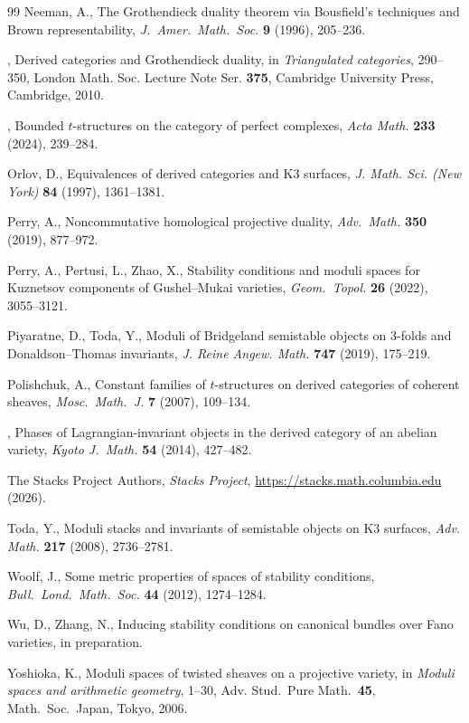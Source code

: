\documentclass[11pt, reqno]{amsart}
\numberwithin{equation}{section}
\theoremstyle{plain}
\theoremstyle{remark}
\theoremstyle{definition}
\theoremstyle{italicsname}
\begin{document}
\begin{thebibliography}{99}
Neeman, A., The Grothendieck duality theorem via Bousfield's techniques and Brown representability, {\it J.\ Amer.\ Math.\ Soc.} {\bf 9} (1996), 205--236.

\bysame, Derived categories and Grothendieck duality, in {\it Triangulated categories}, 290--350, London Math. Soc. Lecture Note Ser. {\bf 375}, Cambridge University Press, Cambridge, 2010.

\bysame, Bounded $t$-structures on the category of perfect complexes,
{\it Acta Math.} {\bf 233} (2024), 239--284.

Orlov, D., Equivalences of derived categories and K3 surfaces, {\it J. Math. Sci. (New York)} {\bf 84} (1997), 1361--1381.

Perry, A., Noncommutative homological projective duality, {\it Adv.\ Math.} {\bf 350} (2019), 877--972.

Perry, A., Pertusi, L., Zhao, X., Stability conditions and moduli spaces for Kuznetsov components of Gushel--Mukai varieties, {\it Geom.\ Topol.} {\bf 26} (2022), 3055--3121.

Piyaratne, D., Toda, Y., Moduli of Bridgeland semistable objects on 3-folds and Donaldson--Thomas invariants, {\it J. Reine Angew. Math.} {\bf 747} (2019), 175--219.

Polishchuk, A., Constant families of {$t$}-structures on derived categories of coherent sheaves, {\it Mosc.\ Math.\ J.} \textbf{7} (2007), 109--134.

\bysame, Phases of Lagrangian-invariant objects in the derived category
  of an abelian variety, {\it Kyoto J.\ Math.} \textbf{54} (2014), 427--482.

The Stacks Project Authors, {\it Stacks Project}, \url{https://stacks.math.columbia.edu} (2026).

Toda, Y., Moduli stacks and invariants of semistable objects on K3 surfaces, {\it Adv. Math.} {\bf 217} (2008), 2736--2781.

Woolf, J., Some metric properties of spaces of stability conditions, {\it Bull.\ Lond.\ Math.\ Soc.} \textbf{44} (2012), 1274--1284.

Wu, D., Zhang, N., Inducing stability conditions on canonical bundles over Fano varieties, in preparation.

Yoshioka, K., Moduli spaces of twisted sheaves on a projective variety, in {\it Moduli spaces and arithmetic geometry}, 1--30, Adv. Stud.\ Pure Math.\ {\bf 45}, Math.\ Soc.\ Japan, Tokyo, 2006.

\end{thebibliography}

\end{document}

